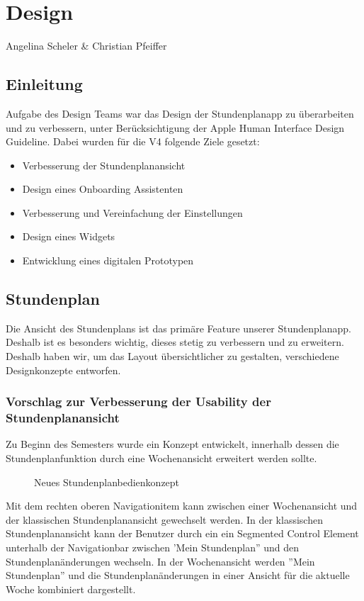\chapter{Design}
Angelina Scheler \& Christian Pfeiffer

\section{Einleitung}
Aufgabe des Design Teams war das Design der Stundenplanapp zu überarbeiten und zu verbessern, unter Berücksichtigung der Apple Human Interface Design Guideline. Dabei wurden für die V4 folgende Ziele gesetzt:

\begin{itemize}
\item Verbesserung der Stundenplanansicht
\item Design eines Onboarding Assistenten
\item Verbesserung und Vereinfachung der Einstellungen
\item Design eines Widgets
\item Entwicklung eines digitalen Prototypen
\end{itemize}


\section{Stundenplan}
Die Ansicht des Stundenplans ist das primäre Feature unserer Stundenplanapp. Deshalb ist es besonders wichtig, dieses stetig zu verbessern und zu erweitern.
Deshalb haben wir, um das Layout übersichtlicher zu gestalten, verschiedene Designkonzepte entworfen.

\subsection{Vorschlag zur Verbesserung der Usability der Stundenplanansicht}
Zu Beginn des Semesters wurde ein Konzept entwickelt, innerhalb dessen die Stundenplanfunktion durch eine Wochenansicht erweitert werden sollte. 

\begin{figure}[H]
	\centering
	\caption{Neues Stundenplanbedienkonzept}
	\label{fig1}
\end{figure}

Mit dem rechten oberen Navigationitem kann zwischen einer Wochenansicht und der klassischen Stundenplanansicht gewechselt werden. In der klassischen Stundenplanansicht kann der Benutzer durch ein ein Segmented Control Element unterhalb der Navigationbar zwischen 'Mein Stundenplan'' und den Stundenplanänderungen wechseln. In der Wochenansicht werden ''Mein Stundenplan'' und die Stundenplanänderungen in einer Ansicht für die aktuelle Woche kombiniert dargestellt. 

